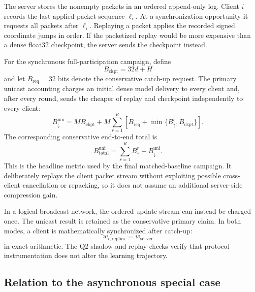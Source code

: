 The server stores the nonempty packets in an ordered append-only log. Client $i$ records the last applied packet sequence $\ell_i$. At a synchronization opportunity it requests all packets after $\ell_i$. Replaying a packet applies the recorded signed coordinate jumps in order. If the packetized replay would be more expensive than a dense float32 checkpoint, the server sends the checkpoint instead.

For the synchronous full-participation campaign, define
\begin{equation}
    B_{\mathrm{ckpt}}=32d+H
    \label{eq:t1-checkpoint-bits}
\end{equation}
and let $B_{\mathrm{req}}=32$ bits denote the conservative catch-up request. The primary unicast accounting charges an initial dense model delivery to every client and, after every round, sends the cheaper of replay and checkpoint independently to every client:
\begin{equation}
    B_{\downarrow}^{\mathrm{uni}}
    =
    M B_{\mathrm{ckpt}}
    +
    M\sum_{r=1}^{R}
    \left[
        B_{\mathrm{req}}
        +
        \min\{B_{\uparrow}^r,B_{\mathrm{ckpt}}\}
    \right].
    \label{eq:t1-unicast-downlink}
\end{equation}
The corresponding conservative end-to-end total is
\begin{equation}
    B_{\mathrm{total}}^{\mathrm{uni}}
    =
    \sum_{r=1}^{R}B_{\uparrow}^r
    +
    B_{\downarrow}^{\mathrm{uni}}.
    \label{eq:t1-total-bits}
\end{equation}
This is the headline metric used by the final matched-baseline campaign. It deliberately replays the client packet stream without exploiting possible cross-client cancellation or repacking, so it does not assume an additional server-side compression gain.

In a logical broadcast network, the ordered update stream can instead be charged once. The unicast result is retained as the conservative primary claim. In both modes, a client is mathematically synchronized after catch-up:
\begin{equation}
    w_{i,\mathrm{replica}}=w_{\mathrm{server}}
\end{equation}
in exact arithmetic. The Q2 shadow and replay checks verify that protocol instrumentation does not alter the learning trajectory.

\subsection{Relation to the asynchronous special case}

